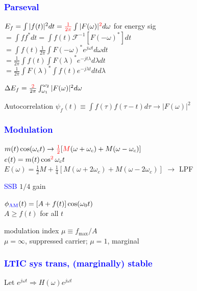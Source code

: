 \documentclass[4pt]{article}
\theoremstyle{definition}
\theoremstyle{definition}
\renewcommand{\o}{\omega}
\newcommand{\ra}{\rightarrow}
\newcommand{\red}[1]{\textcolor{red}{#1}}
\newcommand{\blue}[1]{\textcolor{blue}{#1}}
\begin{document}
\begin{landscape}
\begin{multicols}{3}
\subsubsection*{\blue{Parseval}}
    \(E_f = \int |f(t)|^2 dt = \red{\frac{1}{2\pi}} \int |F(\omega)|^{\red 2} d\o\)  for energy sig\\ 
        \hspace{1em} \(= \int f f^* dt = \int f(t)\mathcal F ^{-1}[F(-\o)^*]dt\)\\
        \hspace{1em} \(= \int f(t) \frac{1}{2\pi} \int F(-\o)^* e^{j\o t} d\o dt\)\\
        \hspace{1em} \(= \frac{1}{2\pi}\int f(t) \int F(\lambda)^* e^{-jt\lambda} d\lambda dt \)\\
        \hspace{1em} \(= \frac{1}{2\pi}\int F(\lambda)^* \int f(t) e^{-j\lambda t} dt d\lambda\)

    \(\Delta E_f = \frac{\red 2}{2\pi}\int^{\o_2}_{\o_1} |F(\o)|^2 d\o\)            %

    Autocorrelation \(\psi_f(t) \equiv \int f(\tau)f(\tau-t)d\tau \ra |F(\o)|^2\)   %
\subsubsection*{\blue{Modulation}}
    \(m(t) \cos(\o_c t) \ra \red{\frac 1 2}[\red{M} (\o + \o_c) + M(\o - \o_c)]\)\\            %
        \hspace{1em} \(e(t) = m(t)\cos^{\red 2} \o_c t\)  \\  
        \hspace{1em} \(E(\o) = \frac{1}{2} M + \frac{1}{4}[M(\o + 2\o_c) + M(\o - 2\o_c)]\) $\ra$ LPF

    \blue{SSB} $1/4$ gain

    \(\phi_\mathrm{\blue{AM}} (t) = [A + f(t)] \cos (\omega_0 t)\)\\
        \hspace{1em} $A \geq f(t)$ for all $t$

        \hspace{1em} modulation index \(\mu\equiv f_{\text{max}}/A\)\\
        \hspace{1em} $\mu = \infty$, suppressed carrier; $\mu = 1$, marginal
\subsubsection*{\blue{LTIC sys trans, (marginally) stable}}
    Let \(e^{j\o t} \Rightarrow H(\o) e^{j\o t}\)


\end{multicols}
\end{landscape}
\end{document}
